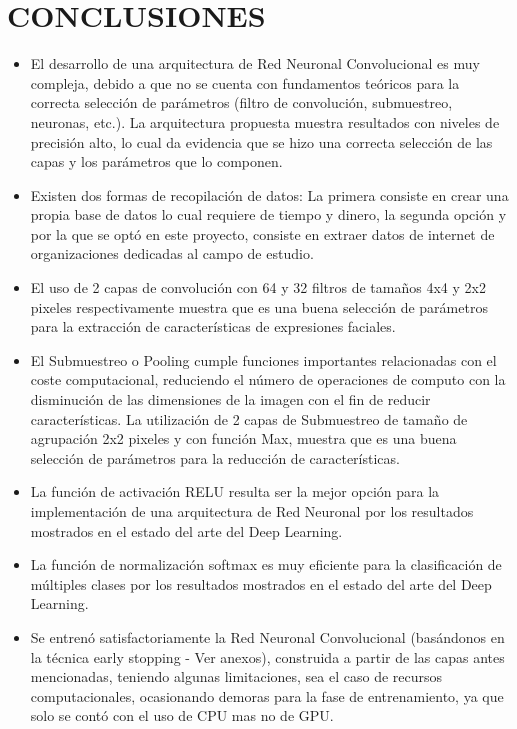 \chapter*{CONCLUSIONES}
\begin{itemize}
\item El desarrollo de una arquitectura de Red Neuronal Convolucional es muy
compleja, debido a que no se cuenta con fundamentos teóricos para la correcta
selección de parámetros (filtro de convolución, submuestreo, neuronas, etc.). La
arquitectura propuesta muestra resultados con niveles de precisión alto, lo cual da
evidencia que se hizo una correcta selección de las capas y los parámetros que lo
componen.
\item Existen dos formas de recopilación de datos: La primera consiste en crear una
propia base de datos lo cual requiere de tiempo y dinero, la segunda opción y por
la que se optó en este proyecto, consiste en extraer datos de internet de
organizaciones dedicadas al campo de estudio.

\item El uso de 2 capas de convolución con 64 y 32 filtros de tamaños 4x4 y 2x2 pixeles
respectivamente muestra que es una buena selección de parámetros para la
extracción de características de expresiones faciales.

\item El Submuestreo o Pooling cumple funciones importantes relacionadas con el coste
computacional, reduciendo el número de operaciones de computo con la
disminución de las dimensiones de la imagen con el fin de reducir características.
La utilización de 2 capas de Submuestreo de tamaño de agrupación 2x2 pixeles y
con función Max, muestra que es una buena selección de parámetros para la
reducción de características.

\item La función de activación RELU resulta ser la mejor opción para la
implementación de una arquitectura de Red Neuronal por los resultados mostrados
en el estado del arte del Deep Learning.

\item La función de normalización softmax es muy eficiente para la clasificación de
múltiples clases por los resultados mostrados en el estado del arte del Deep
Learning.

\item Se entrenó satisfactoriamente la Red Neuronal Convolucional (basándonos en la
técnica early stopping - Ver anexos), construida a partir de las capas antes
mencionadas, teniendo algunas limitaciones, sea el caso de recursos
computacionales, ocasionando demoras para la fase de entrenamiento, ya que solo
se contó con el uso de CPU mas no de GPU.


\end{itemize}
